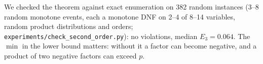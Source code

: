 We checked the theorem against exact enumeration on 382 random instances (3--8
random monotone events, each a monotone DNF on 2--4 of 8--14 variables, random product
distributions and orders; \texttt{experiments/check\_second\_order.py}): no
violations, median $E_3=0.064$. The $\min$ in the lower bound matters: without it a
factor can become negative, and a product of two negative factors can exceed $p$.



